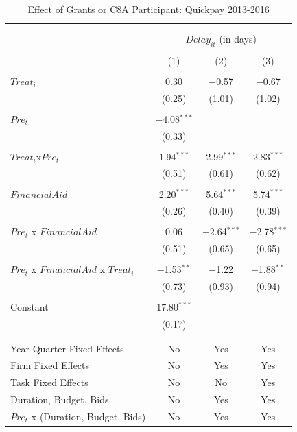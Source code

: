 \documentclass[
]{article}
\begin{document}
\begin{table}[H] \centering 
  \caption{Effect of Grants or C8A Participant: Quickpay 2013-2016} 
  \label{} 
\small 
\begin{tabular}{@{\extracolsep{-2pt}}lccc} 
\\[-1.8ex]\hline 
\hline \\[-1.8ex] 
\\[-1.8ex] & \multicolumn{3}{c}{$Delay_{it}$ (in days)} \\ 
\\[-1.8ex] & (1) & (2) & (3)\\ 
\hline \\[-1.8ex] 
 $Treat_i$ & 0.30 & $-$0.57 & $-$0.67 \\ 
  & (0.25) & (1.01) & (1.02) \\ 
  & & & \\ 
 $Pre_t$ & $-$4.08$^{***}$ &  &  \\ 
  & (0.33) &  &  \\ 
  & & & \\ 
 $Treat_i$x$Pre_t$ & 1.94$^{***}$ & 2.99$^{***}$ & 2.83$^{***}$ \\ 
  & (0.51) & (0.61) & (0.62) \\ 
  & & & \\ 
 $FinancialAid$ & 2.20$^{***}$ & 5.64$^{***}$ & 5.74$^{***}$ \\ 
  & (0.26) & (0.40) & (0.39) \\ 
  & & & \\ 
 $Pre_t$ x $FinancialAid$ & 0.06 & $-$2.64$^{***}$ & $-$2.78$^{***}$ \\ 
  & (0.51) & (0.65) & (0.65) \\ 
  & & & \\ 
 $Pre_t$ x $FinancialAid$ x $Treat_i$ & $-$1.53$^{**}$ & $-$1.22 & $-$1.88$^{**}$ \\ 
  & (0.73) & (0.93) & (0.94) \\ 
  & & & \\ 
 Constant & 17.80$^{***}$ &  &  \\ 
  & (0.17) &  &  \\ 
  & & & \\ 
\hline \\[-1.8ex] 
Year-Quarter Fixed Effects & No & Yes & Yes \\ 
Firm Fixed Effects & No & Yes & Yes \\ 
Task Fixed Effects & No & No & Yes \\ 
Duration, Budget, Bids & No & Yes & Yes \\ 
$Pre_t$  x  (Duration, Budget, Bids) & No & Yes & Yes \\ 

\end{tabular}
\end{table}
\end{document}
